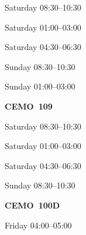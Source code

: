 \documentclass[11pt,oneside,letter]{article}
\begin{document}
\begin{center}
{\large Saturday 08:30--10:30}
\end{center}


\begin{center}
{\large Saturday 01:00--03:00}
\end{center}


\begin{center}
{\large Saturday 04:30--06:30}
\end{center}


\begin{center}
{\large Sunday 08:30--10:30}
\end{center}


\begin{center}
{\large Sunday 01:00--03:00}
\end{center}





\newpage



\begin{center}
{\LARGE {\bf CEMO~109}}
\end{center}


\begin{center}
{\large Saturday 08:30--10:30}
\end{center}


\begin{center}
{\large Saturday 01:00--03:00}
\end{center}


\begin{center}
{\large Saturday 04:30--06:30}
\end{center}


\begin{center}
{\large Sunday 08:30--10:30}
\end{center}







\newpage


\begin{center}
{\LARGE {\bf CEMO~100D}}
\end{center}


\begin{center}
{\large Friday 04:00--05:00}
\end{center}
\end{document}

